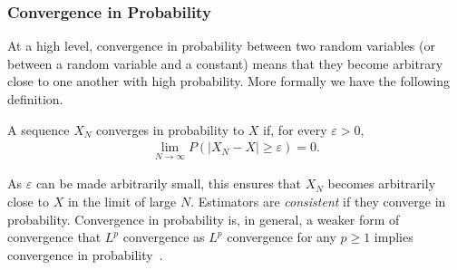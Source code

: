 %
%

\subsubsection{Convergence in Probability}
\label{sec:inf:mc:conv:prob}

At a high level, convergence in probability between two random variables (or between a random variable and
a constant) means that they become arbitrary close to one another with high probability.  More
formally we have the following definition.
\begin{definition}
A sequence $X_N$ converges in probability to $X$ if, for every $\varepsilon>0$,
\begin{align}
\lim\limits_{N\rightarrow\infty} P(\left|X_N-X\right|\ge\varepsilon)=0.
\end{align}
\end{definition}
As $\varepsilon$ can be made arbitrarily small, this ensures that $X_N$ becomes arbitrarily
close to $X$ in the limit of large $N$.  Estimators are \emph{consistent} if they converge
in probability.
Convergence in probability is, in general, a weaker form of convergence that $L^p$ convergence
as $L^p$ convergence for any $p\ge1$ implies convergence in probability~\citep{williams1991probability}.

